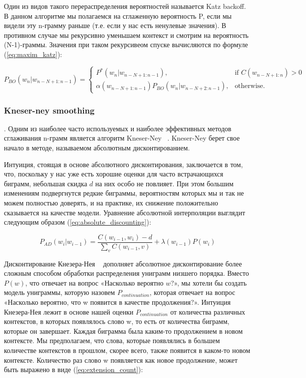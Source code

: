 Один из видов такого перераспределения вероятностей называется Katz backoff. В данном алгоритме мы полагаемся на сглаженную вероятность P, если мы видели эту n-грамму раньше (т.е. если
у нас есть ненулевые значения). В противном случае мы рекурсивно уменьшаем контекст и смотрим на вероятность (N-1)-граммы. Значения при таком рекурсивеом спуске вычисляются по формуле (\ref{eq:maxim_katz}):

\begin{equation}
	P_{BO}(w_n|w_{n-N+1:n-1}) = 
	\begin{cases}
		P^*(w_n|w_{n-N+1:n-1}), & \mbox{if } C(w_{n-N+1:n}) > 0 \\ \alpha(w_{n-N+1:n-1})P_{BO}(w_n|w_{n-N+2:n-1}), & \mbox{otherwise.}
	\end{cases}
	\label{eq:maxim_katz}
\end{equation}

\subsubsection{Kneser-ney smoothing}. Одним из наиболее часто используемых и наиболее эффективных методов сглаживания n-грамм является алгоритм Kneser-Ney ~\cite{kneser_ney}. Kneser-Ney берет свое начало в методе, называемом абсолютным дисконтированием.

Интуиция, стоящая в основе абсолютного дисконтирования, заключается в том, что, поскольку у нас уже есть хорошие оценки для часто встрачающихся биграмм, небольшая скидка
$d$ на них особо не повлияет. При этом большим изменениям подвергнутся редкие биграммы, вероятностям которых мы и так не можем полностью доверять, и на практике, их снижение положительно сказывается на качестве модели. Уравнение абсолютной интерполяции выглядит следующим образом (\ref{eq:absolute_discounting}):

\begin{equation}
	P_{AD}(w_i|w_{i-1}) = \frac{C(w_{i-1}, w_i) - d}{\sum_v{C(w_{i-1}, v)}} + \lambda(w_{i-1})P(w_i)
	\label{eq:absolute_discounting}
\end{equation}

Дисконтирование Кнезера-Нея ~\cite{kneser_ney} дополняет абсолютное дисконтирование более сложным способом обработки распределения униграмм низшего порядка. Вместо $P(w)$, что отвечает на вопрос «Насколько вероятно $w$?», мы хотели бы создать модель униграммы, которую назовем $P_{continuation}$, которая отвечает на вопрос «Насколько вероятно, что w появится в качестве продолжения?».  Интуиция Кнезера-Нея лежит в основе нашей оценки $P_{continuation}$ от количества различных контекстов, в которых появлялось слово w, то есть от количества биграмм, которые он завершает. Каждая биграмма была каким-то продолжением в новом контексте. Мы предполагаем, что слова, которые появлялись в большем количестве контекстов в
прошлом, скорее всего, также появится в каком-то новом контексте. Количество раз слово w появляется как новое продолжение, может быть выражено в виде (\ref{eq:extension_count}):

